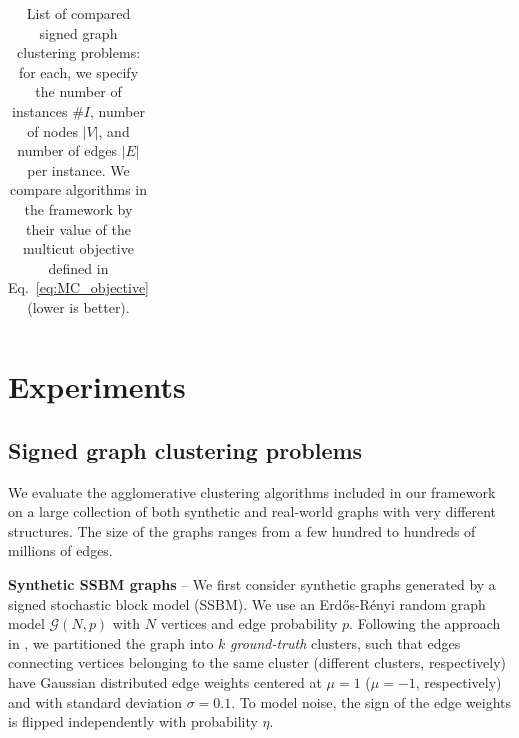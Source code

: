 \begin{table}[t]
\begin{subtable}[t!]{\textwidth}
\begin{tabular}{l  c  r  c  c  | r r r r r r}


        \end{tabular}
    \end{subtable} 
    \caption{List of compared signed graph clustering problems: for each, we specify the number of instances $\# I$, number of nodes $|V|$, and number of edges $|E|$ per instance. We compare algorithms in the \algname{} framework by their value of the multicut objective defined in Eq.~\ref{eq:MC_objective} (lower is better).} 
    \label{tab:datasets_and_energies}
\end{table}


\section{Experiments}\label{sec:neuro_segm_exp}
\subsection{Signed graph clustering problems} \label{sec:clustering_problems}
We evaluate the agglomerative clustering algorithms included in our framework on a large collection of both synthetic and real-world graphs with very different structures. The size of the graphs ranges from a few hundred to hundreds of millions of edges.

\textbf{Synthetic SSBM graphs} -- We first consider synthetic graphs generated by a signed stochastic block model (SSBM). We use an Erd\H os-R\'enyi random graph model $\mathcal{G}(N,p)$ with $N$ vertices and edge probability $p$. Following the approach in \cite{Cucuringu2019SPONGEAG}, we partitioned the graph into $k$ \emph{ground-truth} clusters, such that edges connecting vertices belonging to the same cluster (different clusters, respectively) have Gaussian distributed edge weights centered at $\mu=1$ ($\mu=-1$, respectively) and with standard deviation $\sigma=0.1$. To model noise, the sign of the edge weights is flipped independently with probability $\eta$.


